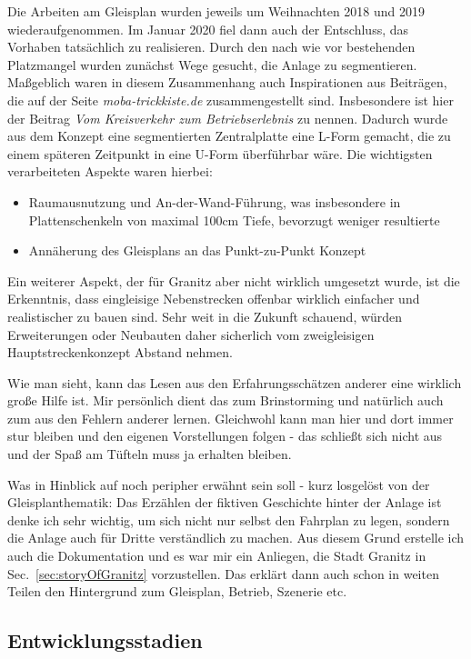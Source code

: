 Die Arbeiten am Gleisplan wurden jeweils um Weihnachten 2018 und 2019 wiederaufgenommen.
Im Januar 2020 fiel dann auch der Entschluss, das Vorhaben tats\"achlich zu realisieren.
Durch den nach wie vor bestehenden Platzmangel wurden zun\"achst Wege gesucht, die Anlage zu segmentieren.
Ma{\ss}geblich waren in diesem Zusammenhang auch Inspirationen aus Beitr\"agen, die auf der Seite \textit{moba-trickkiste.de} zusammengestellt sind.
Insbesondere ist hier der Beitrag \textit{Vom Kreisverkehr zum Betriebserlebnis} \cite{Gee17} zu nennen.
Dadurch wurde aus dem Konzept eine segmentierten Zentralplatte eine L-Form gemacht, die zu einem sp\"ateren Zeitpunkt in eine U-Form \"uberf\"uhrbar w\"are.
Die wichtigsten verarbeiteten Aspekte waren hierbei:
\begin{itemize}
	\item Raumausnutzung und An-der-Wand-F\"uhrung, was insbesondere in Plattenschenkeln von maximal 100cm Tiefe, bevorzugt weniger resultierte
	\item Ann\"aherung des Gleisplans an das Punkt-zu-Punkt Konzept
\end{itemize}
Ein weiterer Aspekt, der f\"ur Granitz aber nicht wirklich umgesetzt wurde, ist die Erkenntnis, dass eingleisige Nebenstrecken offenbar wirklich einfacher und realistischer zu bauen sind.
Sehr weit in die Zukunft schauend, w\"urden Erweiterungen oder Neubauten daher sicherlich vom zweigleisigen Hauptstreckenkonzept Abstand nehmen.

Wie man sieht, kann das Lesen aus den Erfahrungssch\"atzen anderer eine wirklich gro{\ss}e Hilfe ist.
Mir pers\"onlich dient das zum Brinstorming und nat\"urlich auch zum aus den Fehlern anderer lernen.
Gleichwohl kann man hier und dort immer stur bleiben und den eigenen Vorstellungen folgen - das schlie{\ss}t sich nicht aus und der Spa{\ss} am T\"ufteln muss ja erhalten bleiben.

Was in Hinblick auf \cite{Gee17} noch peripher erw\"ahnt sein soll - kurz losgel\"ost von der Gleisplanthematik:
Das Erz\"ahlen der fiktiven Geschichte hinter der Anlage ist denke ich sehr wichtig, um sich nicht nur selbst den Fahrplan zu legen, sondern die Anlage auch f\"ur Dritte verst\"andlich zu machen.
Aus diesem Grund erstelle ich auch die Dokumentation und es war mir ein Anliegen, die Stadt Granitz in Sec.~\ref{sec:storyOfGranitz} vorzustellen.
Das erkl\"art dann auch schon in weiten Teilen den Hintergrund zum Gleisplan, Betrieb, Szenerie etc.


\subsection{Entwicklungsstadien}
\label{sec:map_history}

